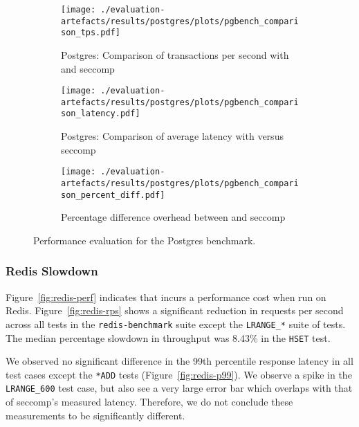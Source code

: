\begin{figure}[htbp]
    \centering
    \begin{subfigure}[b]{0.45 \textwidth}
        \centering
        \texttt{[image: ./evaluation-artefacts/results/postgres/plots/pgbench\_comparison\_tps.pdf]} 
        \caption{Postgres: Comparison of transactions per second with \af
        and seccomp}
        \label{fig:pgs-txs}
    \end{subfigure}
    \hfill
     \begin{subfigure}[b]{0.45 \textwidth}
        \centering
        \texttt{[image: ./evaluation-artefacts/results/postgres/plots/pgbench\_comparison\_latency.pdf]} 
        \caption{Postgres: Comparison of average latency with \af versus
        seccomp}
        \label{fig:pgs-time}
    \end{subfigure}
     \medskip 
     \begin{subfigure}[b]{0.45 \textwidth}
        \centering
        \texttt{[image: ./evaluation-artefacts/results/postgres/plots/pgbench\_comparison\_percent\_diff.pdf]} %
        \caption{Percentage difference overhead between \af and seccomp}
        \label{fig:pgs-percdiff}
    \end{subfigure}

    \caption{Performance evaluation for the Postgres benchmark.}
    \label{fig:pgs-perf}
\end{figure}

\subsubsection{Redis Slowdown}\label{subsubsec:redis-slowdown}

Figure~\ref{fig:redis-perf} indicates that \af incurs a performance cost when
run on Redis. Figure~\ref{fig:redis-rps} shows a significant reduction in
requests per second across all tests in the \texttt{redis-benchmark} suite
except the \texttt{LRANGE\_*} suite of tests. The median percentage slowdown in
throughput was 8.43\% in the \texttt{HSET} test.

We observed no significant difference in the 99th percentile response
latency in all test cases except the \texttt{*ADD} tests 
(Figure~\ref{fig:redis-p99}). We observe a spike in the \texttt{LRANGE\_600}
test case, but also see a very large error bar which overlaps with that of
seccomp's measured latency. Therefore, we do not conclude these measurements to
be significantly different.


